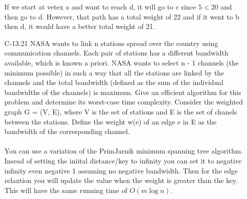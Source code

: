 \begin{itemize}
            If we start at vetex a and want to reach d, it will go to c since $5<20$
            and then go to d. However, that path has a total weight of 22 and if it went to b then d,
            it would have a better total weight of 21.

      \item[C-13.21] NASA wants to link n stations spread over the country using communication
            channels. Each pair of stations has a different bandwidth available,
            which is known a priori. NASA wants to select n - 1 channels (the minimum
            possible) in such a way that all the stations are linked by the channels
            and the total bandwidth (defined as the sum of the individual bandwidths
            of the channels) is maximum. Give an efficient algorithm for this problem
            and determine its worst-case time complexity. Consider the weighted
            graph G = (V, E), where V is the set of stations and E is the set of chanels
            between the stations. Define the weight w(e) of an edge e in E as the
            bandwidth of the corresponding channel.\\
            \answer\\
            You can use a variation of the PrimJarnik minimum spanning tree algorithm.
            Insead of setting the iniital distance/key to infinity you can set it to negative infinity
            even negative 1 assuming no negative bandwidth. Then for the edge relaxtion you will update
            the value when the weight is greater than the key. This will have the same running time of $O(m\log n)$.



\end{itemize}